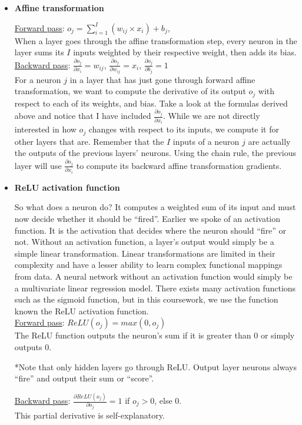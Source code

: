 \begin{itemize}
   \item \textbf{Affine transformation}
  
     \underline{Forward pass}: $o_j= \sum\limits_{i=1}^{I} (w_{ij} \times x_{i}) + b_j$, \\
     When a layer goes through the affine transformation step,
     every neuron in the layer sums its $I$ inputs weighted by their respective weight, then adds its bias.\\

     \underline{Backward pass}: $\frac{\partial o_j}{\partial x_i} = w_{ij}$,
     \space\space $\frac{\partial o_j}{\partial w_{ij}} = x_i$,
     \space\space$\frac{\partial o_j}{\partial b_j} = 1$\\ 
     For a neuron $j$ in a layer that has just gone through forward affine transformation,
     we want to compute the derivative of its output $o_j$ with respect to each of its weights, and bias.
     Take a look at the formulas derived above and notice that I have included $\frac{\partial o_j}{\partial x_i}$.
     While we are not directly interested in how $o_j$ changes with respect to its inputs, we compute it for other layers that are.
     Remember that the $I$ inputs of a neuron $j$ are actually the outputs of the previous layers' neurons.
     Using the chain rule, the previous layer will use $\frac{\partial o_j}{\partial x_i}$
     to compute its backward affine transformation gradients.

   \item \textbf{ReLU activation function}
   
     So what does a neuron do? It computes a weighted sum of its input and must now decide whether it should be ``fired''.
     Earlier we spoke of an activation function.
     It is the activation that decides where the neuron should ``fire'' or not.
     Without an activation function, a layer's output would simply be a simple linear transformation.
     Linear transformations are limited in their complexity and have a lesser ability to learn complex functional mappings from data.
     A neural network without an activation function would simply be a multivariate linear regression model.
     There exists many activation functions such as the sigmoid function,
     but in this coursework, we use the function known the ReLU activation function.\\
     
     \underline{Forward pass}: $ReLU(o_j) = max(0,o_j)$\\
     The ReLU function outputs the neuron's sum if it is greater than 0 or simply outputs 0.
     
     *Note that only hidden layers go through ReLU.
     Output layer neurons always ``fire'' and output their sum or ``score''.

     \underline{Backward pass}: $\frac{\partial ReLU(o_j)}{\partial o_j} = 1$ if $o_j > 0$, else 0.\\
     This partial derivative is self-explanatory.
     
\end{itemize}
